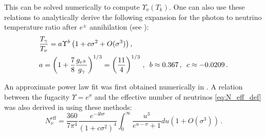 This can be solved numerically to compute $\Upsilon_\nu(T_k)$. One can also use these relations to analytically derive the following expansion for the photon to neutrino temperature ratio after $e^\pm$ annihilation (see \cite{Birrell:2012gg}):
\begin{align}\label{Upsilon_ratio}
&\frac{T_\gamma}{T_\nu}=a\Upsilon^{b}\left(1+c\sigma^2+O(\sigma^3)\right),\\
\label{value_a}
&a=\left(1+\frac{7}{8}\frac{g_{e^\pm}}{g_\gamma}\right)^{1/3}=\left(\frac{11}{4}\right)^{1/3}\,,\,\,\,b\approx 0.367\,, \,\,\,c\approx -0.0209\,.\notag
\end{align}

An approximate power law fit was first obtained numerically in \cite{Birrell:2013gpa}. A relation between   the fugacity $\Upsilon=e^\sigma$ and the effective number of neutrinos \eqref{eq:N_eff_def} was also derived in \cite{Birrell:2012gg} using these methods:
\begin{equation}\label{N_nu_approx}
N^{\mathrm{eff}}_\nu=\frac{360}{7\pi^4}\frac{e^{-4b\sigma}}{(1+c\sigma^2)^4}\int_0^\infty \frac{u^3}{e^{u-\sigma}+1}du\left(1+O(\sigma^3)\right)\,.
\end{equation}


